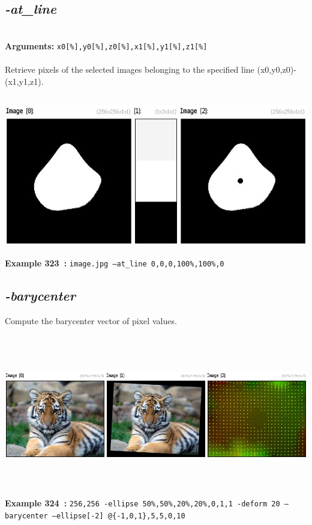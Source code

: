\documentclass[a4paper,11pt,twoside]{book}
\begin{document}
\subsection{\emph{-at\_line} }\vspace*{-0.5em}
~\\\textbf{Arguments: } 
{\small \texttt{x0[\%],y0[\%],z0[\%],x1[\%],y1[\%],z1[\%]}}\\~\\
Retrieve pixels of the selected images belonging to the specified line (x0,y0,z0)-(x1,y1,z1).
\begin{center}\includegraphics[keepaspectratio=true,height=7cm,width=\textwidth]{img/gmic_def323.jpg}\\
{\footnotesize \textbf{Example 323~:} \texttt{image.jpg --at\_line 0,0,0,100\%,100\%,0}}
\end{center}

\subsection{\emph{-barycenter} }\vspace*{-0.5em}
Compute the barycenter vector of pixel values.
\begin{center}\includegraphics[keepaspectratio=true,height=7cm,width=\textwidth]{img/gmic_def324.jpg}\\
{\footnotesize \textbf{Example 324~:} \texttt{256,256 -ellipse 50\%,50\%,20\%,20\%,0,1,1 -deform 20 --barycenter --ellipse[-2] @\{-1,0,1\},5,5,0,10}}
\end{center}
\end{document}
